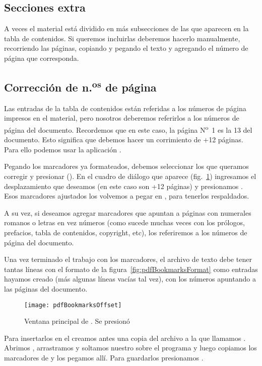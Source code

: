 \documentclass[%
	a5paper,
	10pt,
	twoside,
	openright,
	final,
]{memoir}
\begin{document}
{	\subsection{Secciones extra} A veces el material está dividido en más subsecciones de las que aparecen en la tabla de contenidos. Si queremos incluirlas deberemos hacerlo manualmente, recorriendo las páginas, copiando y pegando el texto y agregando el número de página que corresponda.

	\subsection{Corrección de \texorpdfstring{n.\textsuperscript{os}}{n.os} de página} Las entradas de la tabla de contenidos están referidas a los números de página impresos en el material, pero nosotros deberemos referirlos a los números de página del documento. Recordemos que en este caso, la página N\textsuperscript{o}~1 es la 13 del documento. Esto significa que debemos hacer un corrimiento de +12 páginas. Para ello podemos usar la aplicación \pdg.

	Pegando los marcadores ya formateados, debemos seleccionar los que queramos corregir y presionar \keys{\boldpm} (). En el cuadro de diálogo que aparece (fig.~\ref{fig:pdfBookmarksOffset}) ingresamos el desplazamiento que deseamos (en este caso son +12 páginas) y presionamos . Esos marcadores ajustados los volvemos a pegar en , para tenerlos respaldados.

	A su vez, si deseamos agregar marcadores que apuntan a páginas con numerales romanos o letras en vez números (como sucede muchas veces con los prólogos, prefacios, tabla de contenidos, copyright, etc), los referiremos a los números de página del documento.

	Una vez terminado el trabajo con los marcadores, el archivo de texto  debe tener tantas líneas con el formato de la figura~\ref{fig:pdfBookmarksFormat} como entradas hayamos creado (más algunas líneas vacías tal vez), con los números apuntando a las páginas del documento.

	\begin{figure}
		\texttt{[image: pdfBookmarksOffset]}
		\caption[Ventana principal de \pdg.]{Ventana principal de \pdg. Se presionó \keys{\protect\boldpm}\label{fig:pdfBookmarksOffset}}
	\end{figure}

	Para insertarlos en el \pdf creamos antes una copia del archivo  a la que llamamos . Abrimos \pdg, arrastramos y soltamos nuestro \pdf sobre el programa y luego copiamos los marcadores de  y los pegamos allí. Para guardarlos presionamos .

}
\end{document}
